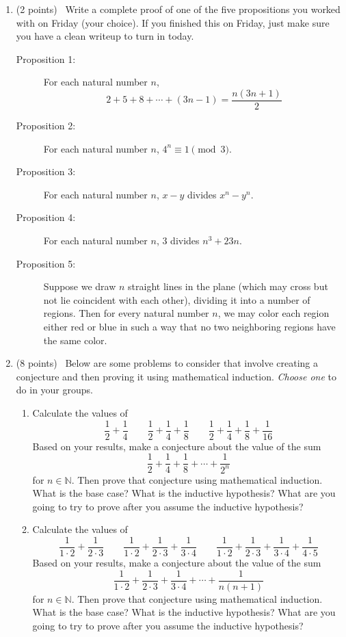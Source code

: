 \documentclass[11pt]{article}
\begin{document}
\begin{enumerate}
	\item (2 points) \ Write a complete proof of one of the five propositions you worked with on Friday (your choice). If you finished this on Friday, just make sure you have a clean writeup to turn in today. 
	\begin{description}
		\item[Proposition 1:] For each natural number $n$, 
		\[ 2 + 5 + 8 + \cdots + (3n-1) = \frac{n(3n+1)}{2} \]
		\item[Proposition 2:] For each natural number $n$, $4^n \equiv 1 \pmod 3$. 
		\item[Proposition 3:] For each natural number $n$, $x-y$ divides $x^n - y^n$. 
		\item[Proposition 4:] For each natural number $n$, $3$ divides $n^3 + 23n$.
		\item[Proposition 5:] Suppose we draw $n$ straight lines in the plane (which may cross but not lie coincident with each other), dividing it into a number of regions. Then for every natural number $n$, we may color each region either red or blue in such a way that no two neighboring regions have the same color. 
	\end{description}
	
	
	\item (8 points) \ Below are some problems to consider that involve creating a conjecture and then proving it using mathematical induction. \emph{Choose one} to do in your groups. 
	\begin{enumerate}
		\item Calculate the values of
		\[ \frac{1}{2} + \frac{1}{4} \qquad \frac{1}{2} + \frac{1}{4} + \frac{1}{8} \qquad \frac{1}{2} + \frac{1}{4} + \frac{1}{8}+ \frac{1}{16}\]
		Based on your results, make a conjecture about the value of the sum 
		\[ \frac{1}{2} + \frac{1}{4} + \frac{1}{8} + \cdots + \frac{1}{2^n} \]
for $n \in \mathbb{N}$. Then prove that conjecture using mathematical induction. What is the base case? What is the inductive hypothesis? What are you going to try to prove after you assume the inductive hypothesis? 

		\item Calculate the values of
		\[ \frac{1}{1 \cdot 2} + \frac{1}{2 \cdot 3} \qquad \frac{1}{1 \cdot 2} + \frac{1}{2 \cdot 3} + \frac{1}{3 \cdot 4} \qquad \frac{1}{1 \cdot 2} + \frac{1}{2 \cdot 3} + \frac{1}{3 \cdot 4} + \frac{1}{4 \cdot 5}\]
		Based on your results, make a conjecture about the value of the sum 
		\[ \frac{1}{1 \cdot 2} + \frac{1}{2 \cdot 3} + \frac{1}{3 \cdot 4} + \cdots + \frac{1}{n(n+1)} \]
for $n \in \mathbb{N}$. Then prove that conjecture using mathematical induction. What is the base case? What is the inductive hypothesis? What are you going to try to prove after you assume the inductive hypothesis?
	\end{enumerate}
	
	
\end{enumerate}
\end{document}
